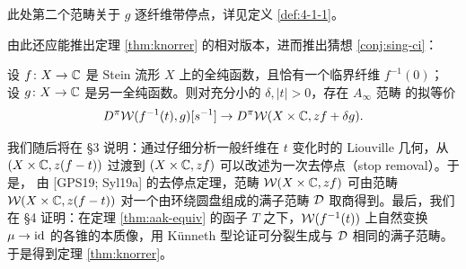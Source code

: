 此处第二个范畴关于 $g$ 逐纤维带停点，详见定义 \ref{def:4-1-1}。

由此还应能推出定理 \ref{thm:knorrer} 的相对版本，进而推出猜想 \ref{conj:sing-ci}：

\begin{conjecture}\label{conj:relative}
设 $f\colon X\to\mathbb{C}$ 是 Stein 流形 $X$ 上的全纯函数，且恰有一个临界纤维 $f^{-1}(0)$；
设 $g\colon X\to\mathbb{C}$ 是另一全纯函数。则对充分小的 $\delta,|t|>0$，存在 $A_\infty$ 范畴
的拟等价
\[
D^\pi\mathcal{W}(f^{-1}(t),g)[s^{-1}]\to D^\pi\mathcal{W}(X\times\mathbb{C},zf+\delta g).
\]
\end{conjecture}

我们随后将在 §3 说明：通过仔细分析一般纤维在 $t$ 变化时的 Liouville 几何，从
$(X\times\mathbb{C},z(f-t))$ 过渡到 $(X\times\mathbb{C},zf)$ 可以改述为一次去停点（stop removal）。于是，
由 [GPS19; Syl19a] 的去停点定理，范畴 $\mathcal{W}(X\times\mathbb{C},zf)$ 可由范畴
$\mathcal{W}(X\times\mathbb{C},z(f-t))$ 对一个由环绕圆盘组成的满子范畴 $\mathcal{D}$ 取商得到。最后，我们在 §4
证明：在定理 \ref{thm:aak-equiv} 的函子 $T$ 之下，$\mathcal{W}(f^{-1}(t))$ 上自然变换
$\mu\to\mathrm{id}$ 的各锥的本质像，用 K{\"u}nneth 型论证可分裂生成与 $\mathcal{D}$ 相同的满子范畴。
于是得到定理 \ref{thm:knorrer}。


